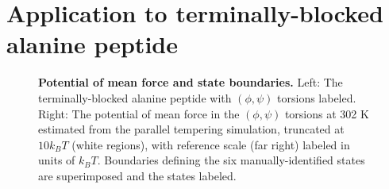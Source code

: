 \section{Application to terminally-blocked alanine peptide}
\label{long-times:section:application-to-alanine-dipeptide}

\begin{figure}[tb]
  \begin{center}
  \end{center}
  \caption{{\bf Potential of mean force and state boundaries.}  Left: The terminally-blocked alanine peptide with $(\phi,\psi)$ torsions labeled.  Right: The potential of mean force in the $(\phi,\psi)$ torsions at 302 K estimated from the parallel tempering simulation, truncated at $10 k_B T$ (white regions), with reference scale (far right) labeled in units of $k_B T$.  Boundaries defining the six manually-identified states are superimposed and the states labeled.}
  \label{long-times:figure:2d-pmf}
\end{figure}

